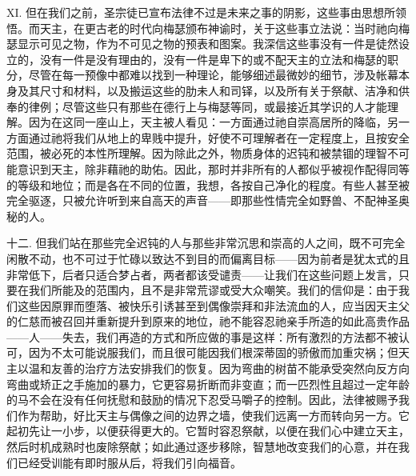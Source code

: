XI. 但在我们之前，圣宗徒已宣布法律不过是未来之事的阴影，这些事由思想所领悟。而天主，在更古老的时代向梅瑟颁布神谕时，关于这些事立法说：当时祂向梅瑟显示可见之物，作为不可见之物的预表和图案。我深信这些事没有一件是徒然设立的，没有一件是没有理由的，没有一件是卑下的或不配天主的立法和梅瑟的职分，尽管在每一预像中都难以找到一种理论，能够细述最微妙的细节，涉及帐幕本身及其尺寸和材料，以及搬运这些的肋未人和司铎，以及所有关于祭献、洁净和供奉的律例；尽管这些只有那些在德行上与梅瑟等同，或最接近其学识的人才能理解。因为在这同一座山上，天主被人看见：一方面通过祂自崇高居所的降临，另一方面通过祂将我们从地上的卑贱中提升，好使不可理解者在一定程度上，且按安全范围，被必死的本性所理解。因为除此之外，物质身体的迟钝和被禁锢的理智不可能意识到天主，除非藉祂的助佑。因此，那时并非所有的人都似乎被视作配得同等的等级和地位；而是各在不同的位置，我想，各按自己净化的程度。有些人甚至被完全驱逐，只被允许听到来自高天的声音——即那些性情完全如野兽、不配神圣奥秘的人。\par

十二. 但我们站在那些完全迟钝的人与那些非常沉思和崇高的人之间，既不可完全闲散不动，也不可过于忙碌以致达不到目的而偏离目标——因为前者是犹太式的且非常低下，后者只适合梦占者，两者都该受谴责——让我们在这些问题上发言，只要在我们所能及的范围内，且不是非常荒谬或受大众嘲笑。我们的信仰是：由于我们这些因原罪而堕落、被快乐引诱甚至到偶像崇拜和非法流血的人，应当因天主父的仁慈而被召回并重新提升到原来的地位，祂不能容忍祂亲手所造的如此高贵作品——人——失去，我们再造的方式和所应做的事是这样：所有激烈的方法都不被认可，因为不太可能说服我们，而且很可能因我们根深蒂固的骄傲而加重灾祸；但天主以温和友善的治疗方法安排我们的恢复。因为弯曲的树苗不能承受突然向反方向弯曲或矫正之手施加的暴力，它更容易折断而非变直；而一匹烈性且超过一定年龄的马不会在没有任何抚慰和鼓励的情况下忍受马嚼子的控制。因此，法律被赐予我们作为帮助，好比天主与偶像之间的边界之墙，使我们远离一方而转向另一方。它起初先让一小步，以便获得更大的。它暂时容忍祭献，以便在我们心中建立天主，然后时机成熟时也废除祭献；如此通过逐步移除，智慧地改变我们的心意，并在我们已经受训能有即时服从后，将我们引向福音。\par

